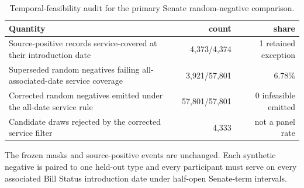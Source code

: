 \begin{table}[tbp]
\centering
\small
\caption{Temporal-feasibility audit for the primary Senate random-negative comparison.}
\label{tab:temporal-feasibility}
\begin{tabular}{p{}rr}
\toprule
Quantity & count & share \\
\midrule
Source-positive records service-covered at their introduction date & 4,373/4,374 & 1 retained exception \\
Superseded random negatives failing all-associated-date service coverage & 3,921/57,801 & 6.78\% \\
Corrected random negatives emitted under the all-date service rule & 57,801/57,801 & 0 infeasible emitted \\
Candidate draws rejected by the corrected service filter & 4,333 & not a panel rate \\
\bottomrule
\end{tabular}
\par\vspace{2pt}\footnotesize The frozen masks and source-positive events are unchanged. Each synthetic negative is paired to one held-out type and every participant must serve on every associated Bill Status introduction date under half-open Senate-term intervals.
\end{table}
